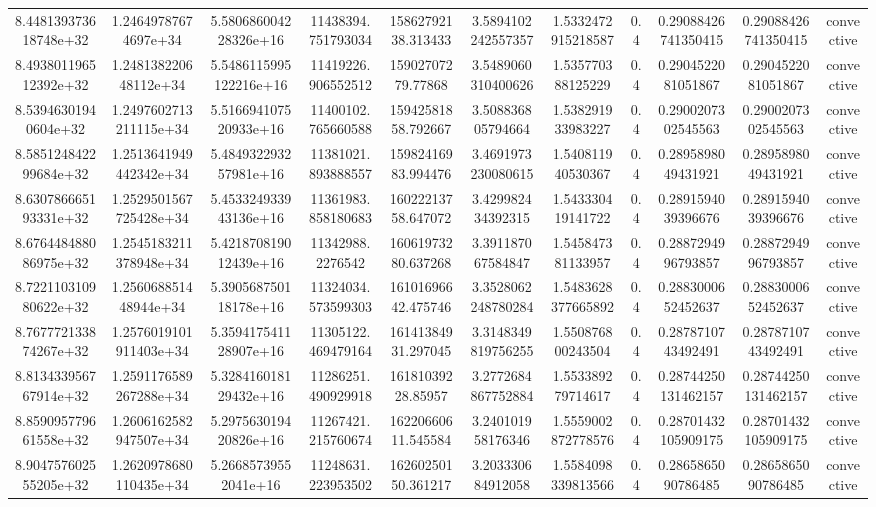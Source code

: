 \begin{table}
\begin{tabular}{ccccccccccc}
8.448139373618748e+32 & 1.24649787674697e+34 & 5.580686004228326e+16 & 11438394.751793034 & 15862792138.313433 & 3.5894102242557357 & 1.5332472915218587 & 0.4 & 0.29088426741350415 & 0.29088426741350415 & convective \\
8.493801196512392e+32 & 1.248138220648112e+34 & 5.5486115995122216e+16 & 11419226.906552512 & 15902707279.77868 & 3.5489060310400626 & 1.535770388125229 & 0.4 & 0.2904522081051867 & 0.2904522081051867 & convective \\
8.53946301940604e+32 & 1.2497602713211115e+34 & 5.516694107520933e+16 & 11400102.765660588 & 15942581858.792667 & 3.508836805794664 & 1.538291933983227 & 0.4 & 0.2900207302545563 & 0.2900207302545563 & convective \\
8.585124842299684e+32 & 1.2513641949442342e+34 & 5.484932293257981e+16 & 11381021.893888557 & 15982416983.994476 & 3.4691973230080615 & 1.540811940530367 & 0.4 & 0.2895898049431921 & 0.2895898049431921 & convective \\
8.630786665193331e+32 & 1.2529501567725428e+34 & 5.453324933943136e+16 & 11361983.858180683 & 16022213758.647072 & 3.429982434392315 & 1.543330419141722 & 0.4 & 0.2891594039396676 & 0.2891594039396676 & convective \\
8.676448488086975e+32 & 1.2545183211378948e+34 & 5.421870819012439e+16 & 11342988.2276542 & 16061973280.637268 & 3.391187067584847 & 1.545847381133957 & 0.4 & 0.2887294996793857 & 0.2887294996793857 & convective \\
8.722110310980622e+32 & 1.256068851448944e+34 & 5.390568750118178e+16 & 11324034.573599303 & 16101696642.475746 & 3.3528062248780284 & 1.5483628377665892 & 0.4 & 0.2883000652452637 & 0.2883000652452637 & convective \\
8.767772133874267e+32 & 1.2576019101911403e+34 & 5.359417541128907e+16 & 11305122.469479164 & 16141384931.297045 & 3.3148349819756255 & 1.550876800243504 & 0.4 & 0.2878710743492491 & 0.2878710743492491 & convective \\
8.813433956767914e+32 & 1.2591176589267288e+34 & 5.328416018129432e+16 & 11286251.490929918 & 16181039228.85957 & 3.2772684867752884 & 1.553389279714617 & 0.4 & 0.28744250131462157 & 0.28744250131462157 & convective \\
8.859095779661558e+32 & 1.2606162582947507e+34 & 5.297563019420826e+16 & 11267421.215760674 & 16220660611.545584 & 3.240101958176346 & 1.5559002872778576 & 0.4 & 0.28701432105909175 & 0.28701432105909175 & convective \\
8.904757602555205e+32 & 1.2620978680110435e+34 & 5.26685739552041e+16 & 11248631.223953502 & 16260250150.361217 & 3.203330684912058 & 1.5584098339813566 & 0.4 & 0.2865865090786485 & 0.2865865090786485 & convective \\

\end{tabular}
\end{table}
